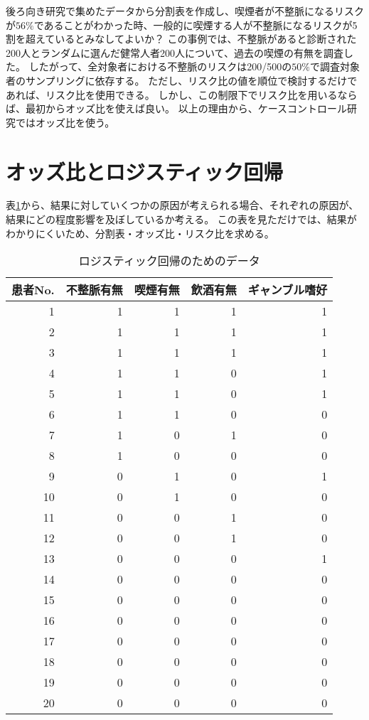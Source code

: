 \documentclass{ltjsarticle}
\begin{document}
後ろ向き研究で集めたデータから分割表を作成し、喫煙者が不整脈になるリスクが$56\%$であることがわかった時、一般的に喫煙する人が不整脈になるリスクが5割を超えているとみなしてよいか？
この事例では、不整脈があると診断された200人とランダムに選んだ健常人者200人について、過去の喫煙の有無を調査した。
したがって、全対象者における不整脈のリスクは200/500の$50\%$で調査対象者のサンプリングに依存する。
ただし、リスク比の値を順位で検討するだけであれば、リスク比を使用できる。
しかし、この制限下でリスク比を用いるならば、最初からオッズ比を使えば良い。
以上の理由から、ケースコントロール研究ではオッズ比を使う。

\section{オッズ比とロジスティック回帰}
表\ref{tbl:logistic}から、結果に対していくつかの原因が考えられる場合、それぞれの原因が、結果にどの程度影響を及ぼしているか考える。
この表を見ただけでは、結果がわかりにくいため、分割表・オッズ比・リスク比を求める。


\begin{table}[b]
    \caption{ロジスティック回帰のためのデータ}
    \label{tbl:logistic}
    \centering
    \begin{tabular}{r|r|r|r|r} \hline
        \multicolumn{1}{l}{患者No.} & \multicolumn{1}{|l|}{不整脈有無} & \multicolumn{1}{l|}{喫煙有無} & \multicolumn{1}{l|}{飲酒有無} & \multicolumn{1}{l}{ギャンブル嗜好} \\ \hline \hline
        1 & 1 & 1 & 1 & 1 \\ 
        2 & 1 & 1 & 1 & 1 \\ 
        3 & 1 & 1 & 1 & 1 \\ 
        4 & 1 & 1 & 0 & 1 \\ 
        5 & 1 & 1 & 0 & 1 \\ 
        6 & 1 & 1 & 0 & 0 \\ 
        7 & 1 & 0 & 1 & 0 \\ 
        8 & 1 & 0 & 0 & 0 \\ 
        9 & 0 & 1 & 0 & 1 \\ 
        10 & 0 & 1 & 0 & 0 \\ 
        11 & 0 & 0 & 1 & 0 \\ 
        12 & 0 & 0 & 1 & 0 \\ 
        13 & 0 & 0 & 0 & 1 \\ 
        14 & 0 & 0 & 0 & 0 \\ 
        15 & 0 & 0 & 0 & 0 \\ 
        16 & 0 & 0 & 0 & 0 \\ 
        17 & 0 & 0 & 0 & 0 \\ 
        18 & 0 & 0 & 0 & 0 \\ 
        19 & 0 & 0 & 0 & 0 \\ 
        20 & 0 & 0 & 0 & 0 \\ \hline
    \end{tabular}
\end{table}
\end{document}
